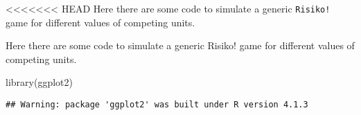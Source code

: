 \documentclass[
]{article}
\newenvironment{Shaded}{\begin{snugshade}}{\end{snugshade}}
\newcommand{\FunctionTok}[1]{\textcolor[rgb]{0.00,0.00,0.00}{#1}}
\newcommand{\NormalTok}[1]{#1}
\begin{document}
\textless\textless\textless\textless\textless\textless\textless{} HEAD
Here there are some code to simulate a generic \texttt{Risiko!} game for
different values of competing units.

Here there are some code to simulate a generic Risiko! game for
different values of competing units.

\begin{Shaded}
\begin{Highlighting}[]
\FunctionTok{library}\NormalTok{(ggplot2)}
\end{Highlighting}
\end{Shaded}

\begin{verbatim}
## Warning: package 'ggplot2' was built under R version 4.1.3
\end{verbatim}
\end{document}
